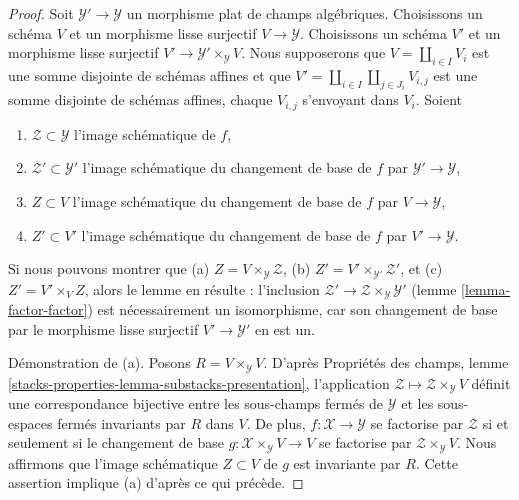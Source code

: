 \begin{proof}
Soit $\mathcal{Y}' \to \mathcal{Y}$ un morphisme plat de champs algébriques.
Choisissons un schéma $V$ et un morphisme lisse surjectif $V \to \mathcal{Y}$.
Choisissons un schéma $V'$ et un
morphisme lisse surjectif $V' \to \mathcal{Y}' \times_\mathcal{Y} V$.
Nous supposerons que $V = \coprod_{i \in I} V_i$ est une somme
disjointe de schémas affines et que
$V' = \coprod_{i \in I} \coprod_{j \in J_i} V_{i, j}$
est une somme disjointe de schémas affines, chaque $V_{i, j}$ s'envoyant dans $V_i$.
Soient
\begin{enumerate}
\item $\mathcal{Z} \subset \mathcal{Y}$ l'image schématique de $f$,
\item $\mathcal{Z}' \subset \mathcal{Y}'$ l'image schématique
du changement de base de $f$ par $\mathcal{Y}' \to \mathcal{Y}$,
\item $Z \subset V$ l'image schématique
du changement de base de $f$ par $V \to \mathcal{Y}$,
\item $Z' \subset V'$ l'image schématique
du changement de base de $f$ par $V' \to \mathcal{Y}$.
\end{enumerate}
Si nous pouvons montrer que
(a) $Z = V \times_\mathcal{Y} \mathcal{Z}$,
(b) $Z' = V' \times_{\mathcal{Y}'} \mathcal{Z}'$, et
(c) $Z' = V' \times_V Z$,
alors le lemme en résulte : l'inclusion
$\mathcal{Z}' \to \mathcal{Z} \times_\mathcal{Y} \mathcal{Y}'$
(lemme \ref{lemma-factor-factor})
est nécessairement un isomorphisme, car son changement de base par le morphisme
lisse surjectif $V' \to \mathcal{Y}'$ en est un.

\medskip\noindent
Démonstration de (a). Posons $R = V \times_\mathcal{Y} V$.
D'après Propriétés des champs, lemme
\ref{stacks-properties-lemma-substacks-presentation},
l'application $\mathcal{Z} \mapsto \mathcal{Z} \times_\mathcal{Y} V$
définit une correspondance bijective entre les sous-champs fermés
de $\mathcal{Y}$ et les sous-espaces fermés invariants par $R$ dans $V$.
De plus, $f : \mathcal{X} \to \mathcal{Y}$ se factorise par $\mathcal{Z}$
si et seulement si le changement de base
$g : \mathcal{X} \times_\mathcal{Y} V \to V$ se factorise par
$\mathcal{Z} \times_\mathcal{Y} V$.
Nous affirmons que l'image schématique $Z \subset V$ de $g$
est invariante par $R$. Cette assertion implique (a) d'après ce qui précède.


\end{proof}
